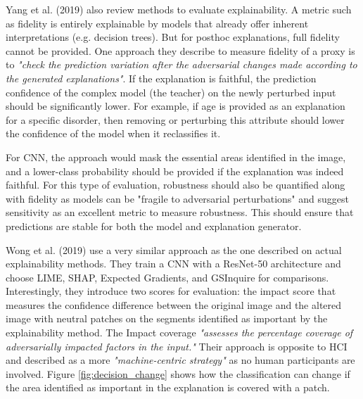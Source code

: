 \documentclass[proposal]{softeng}
\begin{document}
Yang et al. (2019) \cite{YangFan2019EEWG} also review methods to evaluate explainability. A metric such as fidelity is entirely explainable by models that already offer inherent interpretations (e.g. decision trees). But for posthoc explanations, full fidelity cannot be provided. One approach they describe to measure fidelity of a proxy is to \textit{"check the prediction variation after the adversarial changes made according to the generated explanations"}. If the explanation is faithful, the prediction confidence of the complex model (the teacher) on the newly perturbed input should be significantly lower. For example, if age is provided as an explanation for a specific disorder, then removing or perturbing this attribute should lower the confidence of the model when it reclassifies it.

For CNN, the approach would mask the essential areas identified in the image, and a lower-class probability should be provided if the explanation was indeed faithful. For this type of evaluation, robustness should also be quantified along with fidelity as models can be "fragile to adversarial perturbations" and suggest sensitivity as an excellent metric to measure robustness. This should ensure that predictions are stable for both the model and explanation generator.

Wong et al. (2019) \cite{LinZhongQiu2019DERD} use a very similar approach as the one described on actual explainability methods. They train a CNN with a ResNet-50 architecture and choose LIME, SHAP, Expected Gradients, and GSInquire for comparisons. Interestingly, they introduce two scores for evaluation: the impact score that measures the confidence difference between the original image and the altered image with neutral patches on the segments identified as important by the explainability method. The Impact coverage \textit{"assesses the percentage coverage of adversarially impacted factors in the input."} Their approach is opposite to HCI and described as a more \textit{"machine-centric strategy"} as no human participants are involved. Figure \ref{fig:decision_change} shows how the classification can change if the area identified as important in the explanation is covered with a patch.
\end{document}
